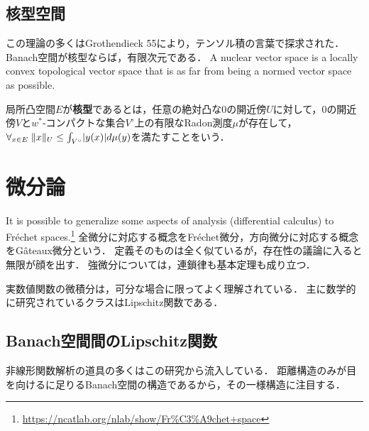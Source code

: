 \documentclass[uplatex,dvipdfmx]{jsreport}
\begin{document}
\subsection{核型空間}

\begin{tcolorbox}[colframe=ForestGreen, colback=ForestGreen!10!white,breakable,colbacktitle=ForestGreen!40!white,coltitle=black,fonttitle=\bfseries\sffamily,
title=]
    この理論の多くはGrothendieck 55により，テンソル積の言葉で探求された．
    Banach空間が核型ならば，有限次元である．
    A nuclear vector space is a locally convex topological vector space that is as far from being a normed vector space as possible.
\end{tcolorbox}

\begin{definition}[nuclear]
    局所凸空間$E$が\textbf{核型}であるとは，任意の絶対凸な$0$の開近傍$U$に対して，$0$の開近傍$V$と$w^*$-コンパクトな集合$V^\circ$上の有限なRadon測度$\mu$が存在して，$\forall_{x\in E}\;\|x\|_U\le\int_{V^\circ}\lvert y(x)\rvert d\mu(y)$を満たすことをいう．
\end{definition}

\section{微分論}

\begin{tcolorbox}[colframe=ForestGreen, colback=ForestGreen!10!white,breakable,colbacktitle=ForestGreen!40!white,coltitle=black,fonttitle=\bfseries\sffamily,
title=]
    It is possible to generalize some aspects of analysis (differential calculus) to Fréchet spaces.\footnote{\url{https://ncatlab.org/nlab/show/Fr\%C3\%A9chet+space}}
    全微分に対応する概念をFréchet微分，方向微分に対応する概念をGâteaux微分という．
    定義そのものは全く似ているが，存在性の議論に入ると無限が顔を出す．
    強微分については，連鎖律も基本定理も成り立つ．

    実数値関数の微積分は，可分な場合に限ってよく理解されている．
    主に数学的に研究されているクラスはLipschitz関数である．
\end{tcolorbox}

\subsection{Banach空間間のLipschitz関数}

\begin{tcolorbox}[colframe=ForestGreen, colback=ForestGreen!10!white,breakable,colbacktitle=ForestGreen!40!white,coltitle=black,fonttitle=\bfseries\sffamily,
title=]
    非線形関数解析の道具の多くはこの研究から流入している．
    距離構造のみが目を向けるに足りるBanach空間の構造であるから，その一様構造に注目する．\cite{Lindenstrauss}
\end{tcolorbox}
\end{document}
